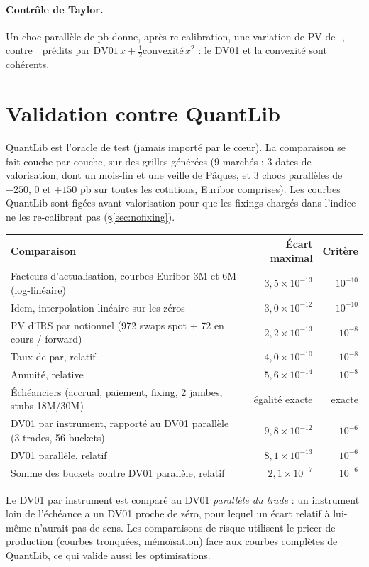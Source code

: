 \documentclass[11pt,a4paper]{article}
\newcommand{\eur}{\ifmmode\,\text{\texteuro}\else\,\texteuro\fi}
\theoremstyle{plain}
\theoremstyle{definition}
\theoremstyle{remark}
\begin{document}
\paragraph{Contrôle de Taylor.} Un choc parallèle de \IrsTaylorShift{} pb donne, après re-calibration,
une variation de PV de \IrsTaylorActual\eur, contre \IrsTaylorEstimate\eur{} prédits par
\(\mathrm{DV01}\,x+\tfrac12\mathrm{convexité}\,x^2\) : le DV01 et la convexité sont cohérents.

\section{Validation contre QuantLib}\label{sec:valid}

QuantLib est l'oracle de test (jamais importé par le cœur). La comparaison se fait couche par couche,
sur des grilles générées (9 marchés : 3 dates de valorisation, dont un mois-fin et une veille de
Pâques, et 3 chocs parallèles de \(-250\), \(0\) et \(+150\) pb sur toutes les cotations, Euribor
comprises). Les courbes QuantLib sont figées avant valorisation pour que les fixings chargés dans
l'indice ne les re-calibrent pas (\S\ref{sec:nofixing}).
\begin{center}
\begin{tabularx}{\linewidth}{@{}Xrr@{}}
\toprule
Comparaison & Écart maximal & Critère \\
\midrule
Facteurs d'actualisation, courbes Euribor 3M et 6M (log-linéaire) & \(3{,}5\times10^{-13}\) & \(10^{-10}\) \\
Idem, interpolation linéaire sur les zéros & \(3{,}0\times10^{-12}\) & \(10^{-10}\) \\
PV d'IRS par notionnel (972 swaps spot + 72 en cours / forward) & \(2{,}2\times10^{-13}\) & \(10^{-8}\) \\
Taux de par, relatif & \(4{,}0\times10^{-10}\) & \(10^{-8}\) \\
Annuité, relative & \(5{,}6\times10^{-14}\) & \(10^{-8}\) \\
Échéanciers (accrual, paiement, fixing, 2 jambes, stubs 18M/30M) & égalité exacte & exacte \\
DV01 par instrument, rapporté au DV01 parallèle (3 trades, 56 buckets) & \(9{,}8\times10^{-12}\) & \(10^{-6}\) \\
DV01 parallèle, relatif & \(8{,}1\times10^{-13}\) & \(10^{-6}\) \\
Somme des buckets contre DV01 parallèle, relatif & \(2{,}1\times10^{-7}\) & \(10^{-6}\) \\
\bottomrule
\end{tabularx}
\end{center}
Le DV01 par instrument est comparé au DV01 \emph{parallèle du trade} : un instrument loin de l'échéance a
un DV01 proche de zéro, pour lequel un écart relatif à lui-même n'aurait pas de sens. Les comparaisons de
risque utilisent le pricer de production (courbes tronquées, mémoïsation) face aux courbes complètes de
QuantLib, ce qui valide aussi les optimisations.
\end{document}
